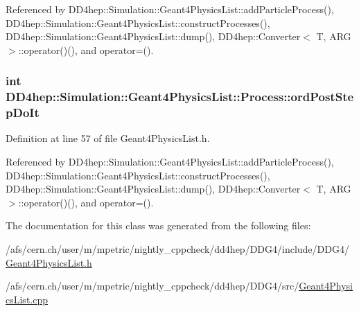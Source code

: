 Referenced by DD4hep::Simulation::Geant4PhysicsList::addParticleProcess(), DD4hep::Simulation::Geant4PhysicsList::constructProcesses(), DD4hep::Simulation::Geant4PhysicsList::dump(), DD4hep::Converter$<$ T, ARG $>$::operator()(), and operator=().\hypertarget{class_d_d4hep_1_1_simulation_1_1_geant4_physics_list_1_1_process_a5c1ea6f1d3867ef4c1c0a74c7d16783b}{
\subsubsection[{ordPostStepDoIt}]{\setlength{\rightskip}{0pt plus 5cm}int {\bf DD4hep::Simulation::Geant4PhysicsList::Process::ordPostStepDoIt}}}
\label{class_d_d4hep_1_1_simulation_1_1_geant4_physics_list_1_1_process_a5c1ea6f1d3867ef4c1c0a74c7d16783b}


Definition at line 57 of file Geant4PhysicsList.h.

Referenced by DD4hep::Simulation::Geant4PhysicsList::addParticleProcess(), DD4hep::Simulation::Geant4PhysicsList::constructProcesses(), DD4hep::Simulation::Geant4PhysicsList::dump(), DD4hep::Converter$<$ T, ARG $>$::operator()(), and operator=().

The documentation for this class was generated from the following files:\begin{DoxyCompactItemize}
\item 
/afs/cern.ch/user/m/mpetric/nightly\_\-cppcheck/dd4hep/DDG4/include/DDG4/\hyperlink{_geant4_physics_list_8h}{Geant4PhysicsList.h}\item 
/afs/cern.ch/user/m/mpetric/nightly\_\-cppcheck/dd4hep/DDG4/src/\hyperlink{_geant4_physics_list_8cpp}{Geant4PhysicsList.cpp}\end{DoxyCompactItemize}
